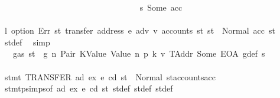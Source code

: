 \begin{isabellebody}
\isanewline
\ \ \ \ \ \ \ \ \ \ \ \ \ \ \ \ \ \ \ \ \ \ \ \ \ \ \ \ \ \ \ \ \isamarkupfalse%
\ s{}{\isacharcolon}{\kern0pt}\ {\isacharparenleft}{\kern0pt}Some\ acc{\isacharparenright}{\kern0pt}\isanewline
\ \ \ \ \ \ \ \ \ \ \ \ \ \ \ \ \ \ \ \ \ \ \ \ \ \ \ \ \ \ \ \ \isamarkupfalse%
\ \isamarkupfalse%
\ l{}{\isacharcolon}{\kern0pt}\ {\isachardoublequoteopen}option\ Err\ {\isacharparenleft}{\kern0pt}{\isasymlambda}st{\isachardot}{\kern0pt}\ transfer\ {\isacharparenleft}{\kern0pt}address\ e{\isacharparenright}{\kern0pt}\ adv\ v{\isacharprime}{\kern0pt}\ {\isacharparenleft}{\kern0pt}accounts\ st{\isacharparenright}{\kern0pt}{\isacharparenright}{\kern0pt}\ st{\isacharprime}{\kern0pt}{\isacharprime}{\kern0pt}{\isacharprime}{\kern0pt}\ {\isacharequal}{\kern0pt}\ Normal\ {\isacharparenleft}{\kern0pt}acc{\isacharcomma}{\kern0pt}\ st{\isacharprime}{\kern0pt}{\isacharprime}{\kern0pt}{\isacharprime}{\kern0pt}{\isacharparenright}{\kern0pt}{\isachardoublequoteclose}\ \isamarkupfalse%
\ st{\isacharprime}{\kern0pt}{\isacharprime}{\kern0pt}{\isacharprime}{\kern0pt}{\isacharunderscore}{\kern0pt}def\ \isamarkupfalse%
\ simp\isanewline
\ \ \ \ \ \ \ \ \ \ \ \ \ \ \ \ \ \ \ \ \ \ \ \ \ \ \ \ \ \ \ \ \isamarkupfalse%
\ {}{\isacharparenleft}{\kern0pt}{}{\isacharparenright}{\kern0pt}\ {\isacharbackquoteopen}{\isasymnot}\ gas\ st\ {\isasymle}\ g{\isacharbackquoteclose}\ n\ Pair\ KValue\ Value\ n{}\ p{}\ k{}\ v{}\ TAddr\ Some\ EOA\ g{\isacharunderscore}{\kern0pt}def\ s{}\isanewline
\ \ \ \ \ \ \ \ \ \ \ \ \ \ \ \ \ \ \ \ \ \ \ \ \ \ \ \ \ \ \ \ \ \ \isamarkupfalse%
\ {\isachardoublequoteopen}stmt\ {\isacharparenleft}{\kern0pt}TRANSFER\ ad\ ex{\isacharparenright}{\kern0pt}\ e\ cd\ st\ {\isacharequal}{\kern0pt}\ Normal\ {\isacharparenleft}{\kern0pt}{\isacharparenleft}{\kern0pt}{\isacharparenright}{\kern0pt}{\isacharcomma}{\kern0pt}st{\isacharprime}{\kern0pt}{\isacharprime}{\kern0pt}{\isacharprime}{\kern0pt}{\isasymlparr}accounts{\isacharcolon}{\kern0pt}{\isacharequal}{\kern0pt}acc{\isasymrparr}{\isacharparenright}{\kern0pt}{\isachardoublequoteclose}\ \isamarkupfalse%
\ stmt{\isachardot}{\kern0pt}psimps{\isacharparenleft}{\kern0pt}{}{\isacharparenright}{\kern0pt}{\isacharbrackleft}{\kern0pt}of\ ad\ ex\ e\ cd\ st{\isacharbrackright}{\kern0pt}\ st{\isacharprime}{\kern0pt}{\isacharunderscore}{\kern0pt}def\ st{\isacharprime}{\kern0pt}{\isacharprime}{\kern0pt}{\isacharunderscore}{\kern0pt}def\ st{\isacharprime}{\kern0pt}{\isacharprime}{\kern0pt}{\isacharprime}{\kern0pt}{\isacharunderscore}{\kern0pt}def\ \isamarkupfalse%

\end{isabellebody}
